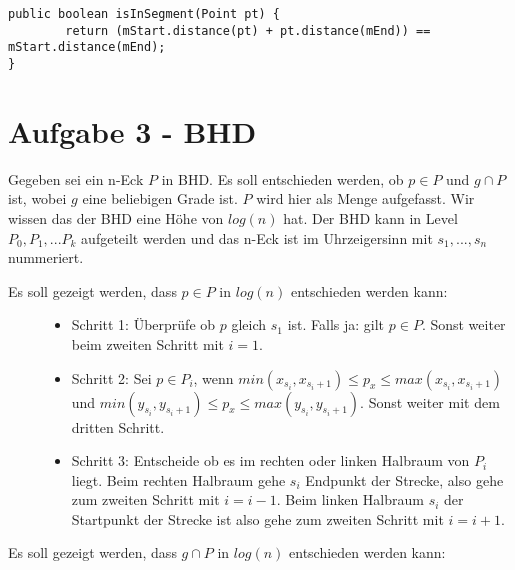 \documentclass[a4paper]{article}
\begin{document}
\begin{lstlisting}
public boolean isInSegment(Point pt) {
        return (mStart.distance(pt) + pt.distance(mEnd)) == mStart.distance(mEnd);
}
\end{lstlisting}

\section*{Aufgabe 3 - BHD}

Gegeben sei ein n-Eck $P$ in BHD. Es soll entschieden werden, ob $ p \in P$ und $g \cap P$ ist, wobei $g$ eine beliebigen Grade ist. $P$ wird hier als Menge aufgefasst. Wir wissen das der BHD eine Höhe von $log(n)$ hat. Der BHD kann in Level $P_0, P_1, ... P_k$ aufgeteilt werden und das n-Eck ist im Uhrzeigersinn mit $s_1, ..., s_n$ nummeriert.

\begin{description}
	\item[Es soll gezeigt werden, dass $p \in P$ in $log(n)$ entschieden werden kann:]

\begin{itemize}

\item Schritt 1: Überprüfe ob $p$ gleich $s_1$ ist. Falls ja: gilt $p \in P$. Sonst weiter beim zweiten Schritt mit $i=1$.

\item Schritt 2: Sei $p \in P_i$, wenn $min(x_{s_i}, x_{s_i+1}) \leq p_x \leq max(x_{s_i}, x_{s_i+1})$ und $min(y_{s_i}, y_{s_i+1}) \leq p_x \leq max(y_{s_i}, y_{s_i+1})$. Sonst weiter mit dem dritten Schritt.

\item Schritt 3: Entscheide ob es im rechten oder linken Halbraum von $P_i$ liegt. Beim rechten Halbraum gehe $s_i$ Endpunkt der Strecke, also gehe zum zweiten Schritt mit $i= i-1$. Beim linken Halbraum $s_i$ der Startpunkt der Strecke ist also gehe zum zweiten Schritt mit $i= i+1$.

\end{itemize}




	\item[Es soll gezeigt werden, dass $g \cap	 P$ in $log(n)$ entschieden werden kann:]

\end{description}
\end{document}
